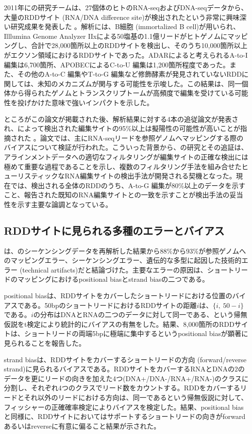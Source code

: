 2011年に\cite{pmid21596952}の研究チームは、27個体のヒトのRNA-seqおよびDNA-seqデータから、大量のRDDサイト (RNA/DNA difference site)が検出されたという非常に興味深い研究成果を発表した \citep{pmid21596952}。解析には、B細胞 (immortalized B cell)が用いられ、Illlumina Genome Analyzer IIxによる50塩基の1.1億リードがヒトゲノムにマッピングし、合計で28,000箇所以上のRDDサイトを検出し、そのうち10,000箇所以上がエクソン領域におけるRDDサイトであった。ADARによると考えられるA-to-I編集は6,700箇所、APOBECによるC-to-U 編集は1,200箇所程度であった。また、その他のA-to-C 編集やT-to-G 編集など修飾酵素が発見されていないRDDに関しては、未知のメカニズムが関与する可能性を示唆した。この結果は、同一個体から得られたゲノムとトランスクリプトームが高頻度で編集を受けている可能性を投げかけた意味で強いインパクトを示した。
\par
ところがこの論文が掲載された後、解析結果に対する4本の追従論文が発表され、\cite{pmid21596952}によって検出された編集サイトの95\%以上は擬陽性の可能性が高いことが指摘された \citep{pmid22422962, pmid22422964, pmid22422963, pmid22022455}。論文では、主にRNA-seqリードを参照ゲノムへマッピングする際のバイアスについて検証が行われた。こういった背景から、\cite{pmid21596952}の研究とその追証は、アラインメントデータへの適切なフィルタリングが編集サイトの正確な検出には極めて重要な過程であることを示し、複数のフィルタリング手法を組み合せたヒューリスティックなRNA編集サイトの検出手法が開発される契機となった。現在では、検出される全体のRDDのうち、A-to-G 編集が80\%以上のデータを示すこと、報告された既知のRNA編集サイトとの一致を示すことが検出手法の妥当性を示す主要な論調となっている。

\subsection{RDDサイトに見られる多種のエラーとバイアス}
\cite{pmid22422963}は、\cite{pmid21596952}のシーケンシングデータを再解析した結果から88\%から93\%が参照ゲノムへのマッピングエラー、シーケンシングエラー、遺伝的な多型に起因した技術的エラー (technical artifacts)だと結論づけた。主要なエラーの原因は、ショートリードのマッピングにおけるpositional biasとstrand biasの二つである。
\par
positional biasは、RDDサイトをカバーしたショートリードにおける位置のバイアスである。50bpのショートリードにおけるRDDサイトの距離$i$は、$\{i,\ 50-i\}$である。$i$の分布はDNAとRNAの二つのデータに対して同一である、という帰無仮説をt検定により統計的にバイアスの有無をした。結果、8,000箇所のRDDサイトは、ショートリードの両端5bpに極端に集中するというpositional biasが顕著に見られることを報告した。
\par
strand biasは、RDDサイトをカバーするショートリードの方向 (forward/reverse strand)に見られるバイアスである。RDDサイトをカバーするRNAとDNAの2のデータを更にリードの向きを加えた4つ(DNA+/DNA-/RNA+/RNA-)のクラスに分割し、それぞれ4つのクラスでリード数をカウントする。RDDをカバーするリードとそれ以外のリードにおける方向は、同一であるという帰無仮説に対して、フィッシャーの正確確率検定によりバイアスを検定した。結果、positional biasと同様に、RDDサイトにおいてはサポートするショートリードの向きがforwardあるいはreverseに有意に偏ること結果が示された。


